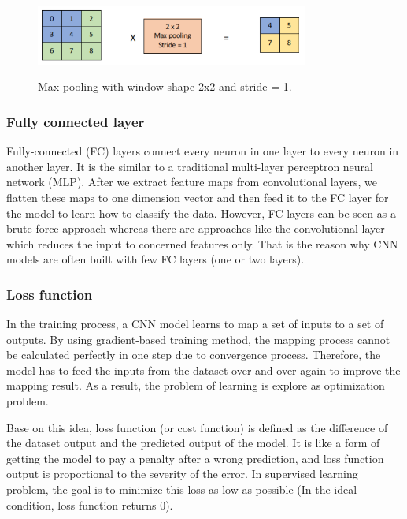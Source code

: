 	\begin{figure}[H]
		\centering
		{\includegraphics[width=0.8\textwidth]{./hinhanh/chap3/max_pooling.png}}
		\caption{Max pooling with window shape 2x2 and stride = 1.}
	\end{figure}
	
\subsubsection{Fully connected layer}
\noindent

	Fully-connected (FC) layers connect every neuron in one layer to every neuron in another layer. It is the similar to a traditional multi-layer perceptron neural network (MLP). After we extract feature maps from convolutional layers, we flatten these maps to one dimension vector and then feed it to the FC layer for the model to learn how to classify the data. However, FC layers can be seen as a brute force approach whereas there are approaches like the convolutional layer which reduces the input to concerned features only. That is the reason why CNN models are often built with few FC layers (one or two layers).	
	
\subsubsection{Loss function}
\label{subsubsection:lossfunc}
\noindent

	In the training process, a CNN model learns to map a set of inputs to a set of outputs. By using gradient-based training method, the mapping process cannot be calculated perfectly in one step due to convergence process. Therefore, the model has to feed the inputs from the dataset over and over again to improve the mapping result. As a result, the problem of learning is explore as optimization problem. 
	
	Base on this idea, loss function (or cost function) is defined as the difference of the dataset output and the predicted output of the model. It is like a form of getting the model to pay a penalty after a wrong prediction, and loss function output is proportional to the severity of the error. In supervised learning problem, the goal is to minimize this loss as low as possible (In the ideal condition, loss function returns 0).
	
